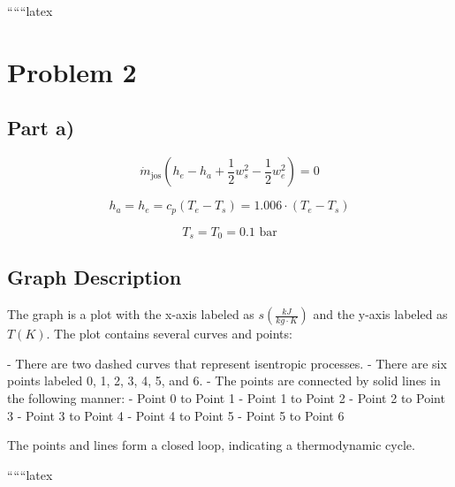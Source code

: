 
``````latex


\section*{Problem 2}
\subsection*{Part a)}

\begin{equation*}
\dot{m}_{\text{jos}} \left( h_e - h_a + \frac{1}{2} w_s^2 - \frac{1}{2} w_e^2 \right) = 0
\end{equation*}

\begin{equation*}
h_a = h_e = c_p (T_e - T_s) = 1.006 \cdot (T_e - T_s)
\end{equation*}

\begin{equation*}
T_s = T_0 = 0.1 \text{ bar}
\end{equation*}

\subsection*{Graph Description}

The graph is a plot with the x-axis labeled as \( s \left( \frac{kJ}{kg \cdot K} \right) \) and the y-axis labeled as \( T (K) \). The plot contains several curves and points:

- There are two dashed curves that represent isentropic processes.
- There are six points labeled 0, 1, 2, 3, 4, 5, and 6.
- The points are connected by solid lines in the following manner:
  - Point 0 to Point 1
  - Point 1 to Point 2
  - Point 2 to Point 3
  - Point 3 to Point 4
  - Point 4 to Point 5
  - Point 5 to Point 6

The points and lines form a closed loop, indicating a thermodynamic cycle.

``````latex


